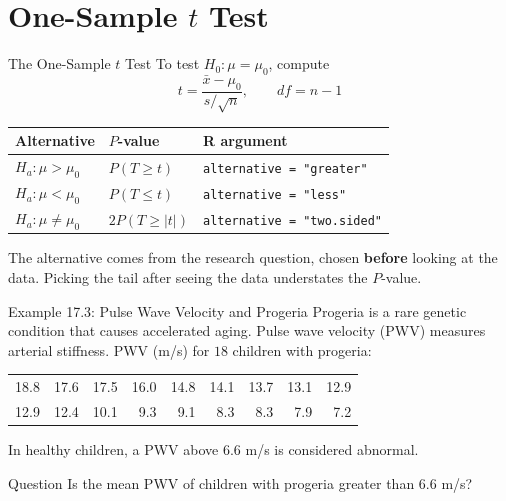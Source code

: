 \documentclass[aspectratio=169,10pt]{beamer}
\begin{document}
\section{One-Sample $t$ Test}

\begin{frame}{The One-Sample $t$ Test}
To test $H_0:\mu=\mu_0$, compute
$$t=\frac{\bar{x}-\mu_0}{s/\sqrt{n}},\qquad df=n-1$$

\begin{center}
\begin{tabular}{lll}
\toprule
\textbf{Alternative} & \textbf{$P$-value} & \textbf{R argument} \\
\midrule
$H_a:\mu>\mu_0$ & $P(T\ge t)$ & \texttt{alternative = "greater"} \\
$H_a:\mu<\mu_0$ & $P(T\le t)$ & \texttt{alternative = "less"} \\
$H_a:\mu\ne\mu_0$ & $2P(T\ge |t|)$ & \texttt{alternative = "two.sided"} \\
\bottomrule
\end{tabular}
\end{center}

\vspace{0.2cm}
The alternative comes from the research question, chosen \textbf{before} looking at the data. Picking the tail after seeing the data understates the $P$-value.
\end{frame}

\begin{frame}{Example 17.3: Pulse Wave Velocity and Progeria}
Progeria is a rare genetic condition that causes accelerated aging. Pulse wave velocity (PWV) measures arterial stiffness. PWV (m/s) for $18$ children with progeria:
\begin{center}
\begin{tabular}{rrrrrrrrr}
18.8 & 17.6 & 17.5 & 16.0 & 14.8 & 14.1 & 13.7 & 13.1 & 12.9 \\
12.9 & 12.4 & 10.1 & 9.3 & 9.1 & 8.3 & 8.3 & 7.9 & 7.2 \\
\end{tabular}
\end{center}

\vspace{0.2cm}
In healthy children, a PWV above $6.6$ m/s is considered abnormal.

\vspace{0.2cm}
\begin{block}{Question}
Is the mean PWV of children with progeria greater than $6.6$ m/s?
\end{block}
\end{frame}
\end{document}
